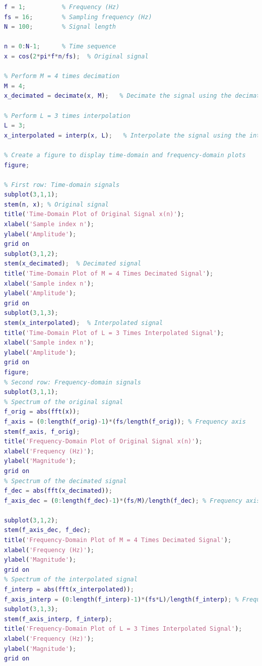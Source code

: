 \documentclass[lang=cn,newtx,10pt,scheme=chinese]{elegantbook}
\begin{document}
\begin{example}[令$x(n) =\cos(2\pi fn/f_s)$，其中$f/f_s$ = 1/16，即每个周期内有16个点。试利用MATLAB编程实现：作M = 4倍的抽取，使每个周期变成4点。作L = 3倍的插值，使每个周期变成48点。
  ]
  \begin{lstlisting}[language=matlab]
f = 1;          % Frequency (Hz)
fs = 16;        % Sampling frequency (Hz)
N = 100;        % Signal length

n = 0:N-1;      % Time sequence
x = cos(2*pi*f*n/fs);  % Original signal

% Perform M = 4 times decimation
M = 4;
x_decimated = decimate(x, M);   % Decimate the signal using the decimate function

% Perform L = 3 times interpolation
L = 3;
x_interpolated = interp(x, L);   % Interpolate the signal using the interp function

% Create a figure to display time-domain and frequency-domain plots
figure;

% First row: Time-domain signals
subplot(3,1,1);
stem(n, x); % Original signal
title('Time-Domain Plot of Original Signal x(n)');
xlabel('Sample index n');
ylabel('Amplitude');
grid on
subplot(3,1,2);
stem(x_decimated);  % Decimated signal
title('Time-Domain Plot of M = 4 Times Decimated Signal');
xlabel('Sample index n');
ylabel('Amplitude');
grid on
subplot(3,1,3);
stem(x_interpolated);  % Interpolated signal
title('Time-Domain Plot of L = 3 Times Interpolated Signal');
xlabel('Sample index n');
ylabel('Amplitude');
grid on
figure;
% Second row: Frequency-domain signals
subplot(3,1,1);
% Spectrum of the original signal
f_orig = abs(fft(x));
f_axis = (0:length(f_orig)-1)*(fs/length(f_orig)); % Frequency axis
stem(f_axis, f_orig);
title('Frequency-Domain Plot of Original Signal x(n)');
xlabel('Frequency (Hz)');
ylabel('Magnitude');
grid on
% Spectrum of the decimated signal
f_dec = abs(fft(x_decimated));
f_axis_dec = (0:length(f_dec)-1)*(fs/M)/length(f_dec); % Frequency axis after decimation

subplot(3,1,2);
stem(f_axis_dec, f_dec);
title('Frequency-Domain Plot of M = 4 Times Decimated Signal');
xlabel('Frequency (Hz)');
ylabel('Magnitude');
grid on
% Spectrum of the interpolated signal
f_interp = abs(fft(x_interpolated));
f_axis_interp = (0:length(f_interp)-1)*(fs*L)/length(f_interp); % Frequency axis after interpolation
subplot(3,1,3);
stem(f_axis_interp, f_interp);
title('Frequency-Domain Plot of L = 3 Times Interpolated Signal');
xlabel('Frequency (Hz)');
ylabel('Magnitude');
grid on
  \end{lstlisting}
\end{example}
\end{document}
